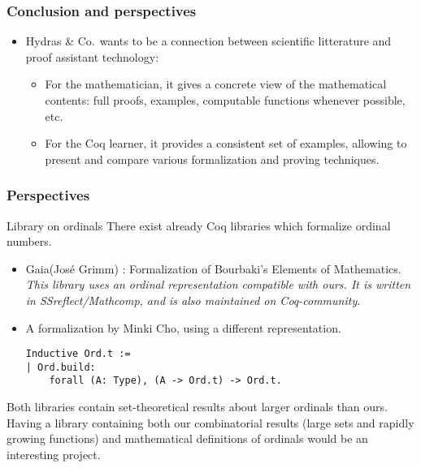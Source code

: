 \documentclass[10pt]{beamer}
\newcommand{\TODO}[2][]{[\textcolor{red}{TODO (#1):} \emph{#2}]}
\newcommand{\coq}{Coq\xspace}
\newcommand{\community}{Coq-community\xspace}
\newcommand{\gaia}{Gaia\xspace}
\newcommand{\Hydras}{Hydras \& Co$\text.$\xspace}
\begin{document}


\begin{frame}
  \frametitle{Conclusion and perspectives}
  \begin{block}{}
    \begin{itemize}
    \item \Hydras wants to be a connection between scientific litterature and proof assistant technology:
      \begin{itemize}
      \item For the mathematician, it gives a concrete view of the mathematical contents: full proofs, examples, computable functions whenever possible, etc.
        \item  For the \coq learner, it provides a consistent set of examples,
allowing to present and compare various formalization and proving techniques.
      \end{itemize}
    \end{itemize}
  \end{block}
  \end{frame}


\begin{frame}[fragile]
  \frametitle{Perspectives}
  \begin{block}{Library on ordinals}
    There exist already \coq libraries which formalize ordinal numbers.
    \begin{itemize}
    \item \gaia (José Grimm) : Formalization of Bourbaki's Elements of Mathematics. {\color{lookcolor}\emph{This library uses an ordinal representation compatible with ours. It is  written in SSreflect/Mathcomp, and is also maintained on \community}.}
    \item A formalization by Minki Cho, using a different representation.
{\color{darkorange}
\begin{verbatim}
Inductive Ord.t :=
| Ord.build: 
    forall (A: Type), (A -> Ord.t) -> Ord.t.
\end{verbatim}
}  
    \end{itemize}

    Both libraries contain set-theoretical results about larger ordinals than ours. Having a library containing both our combinatorial results (large sets and rapidly growing functions) and mathematical definitions of ordinals would be an interesting project.
  \end{block}
\end{frame}
\end{document}
